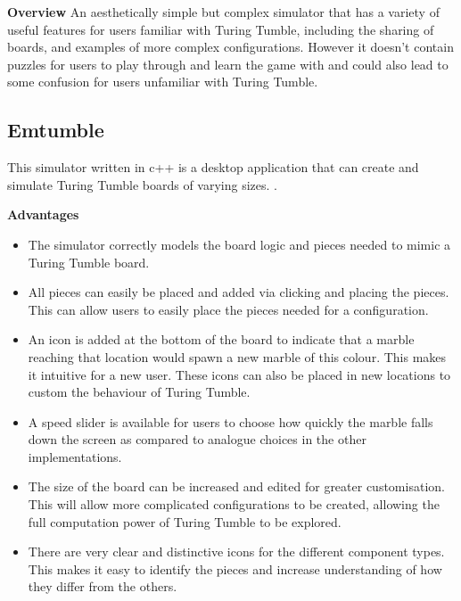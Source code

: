 \documentclass{l4proj}
\begin{document}
\textbf{Overview}
An aesthetically simple but complex simulator that has a variety of useful features for users familiar with Turing Tumble, including the sharing of boards, and examples of more complex configurations. However it doesn't contain puzzles for users to play through and learn the game with and could also lead to some confusion for users unfamiliar with Turing Tumble.

\subsection{Emtumble}
This simulator written in c++ is a desktop application that can create and simulate Turing Tumble boards of varying sizes. \cite{tomita_oudonemtumble_2020}.

\textbf{Advantages}
\begin{itemize}
    \item The simulator correctly models the board logic and pieces needed to mimic a Turing Tumble board.
    \item All pieces can easily be placed and added via clicking and placing the pieces. This can allow users to easily place the pieces needed for a configuration.
    \item An icon is added at the bottom of the board to indicate that a marble reaching that location would spawn a new marble of this colour. This makes it intuitive for a new user. These icons can also be placed in new locations to custom the behaviour of Turing Tumble.
    \item A speed slider is available for users to choose how quickly the marble falls down the screen as compared to analogue choices in the other implementations.
    \item The size of the board can be increased and edited for greater customisation. This will allow more complicated configurations to be created, allowing the full computation power of Turing Tumble to be explored.
    \item There are very clear and distinctive icons for the different component types. This makes it easy to identify the pieces and increase understanding of how they differ from the others.
\end{itemize}
\end{document}

